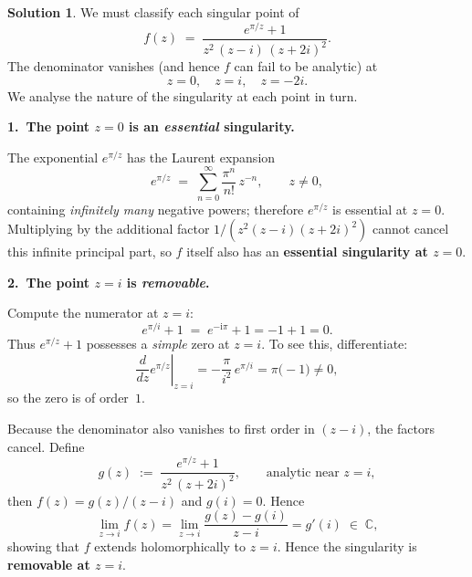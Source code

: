 \documentclass[12pt]{article}
\theoremstyle{definition} %
\newtheorem{solution}{Solution}
\theoremstyle{plain} %
\begin{document}
          \begin{solution}
            We must classify each singular point of 
            \[
               f(z)\;=\;\frac{e^{\pi/z}+1}{z^{2}\,(z-i)\,(z+2i)^{2}}.
            \]
            The denominator vanishes (and hence $f$ can fail to be analytic) at
            \[
               z=0,\quad z=i,\quad z=-2i.
            \]
            We analyse the nature of the singularity at each point in turn.
            
            \bigskip
            \textbf{1.\ The point $z=0$ is an \emph{essential} singularity.}
            
            The exponential $e^{\pi/z}$ has the Laurent expansion
            \[
               e^{\pi/z}
               \;=\;
               \sum_{n=0}^{\infty}\frac{\pi^{n}}{n!}\,z^{-n},
               \qquad z\neq0,
            \]
            containing \emph{infinitely many} negative powers; therefore
            $e^{\pi/z}$ is essential at $z=0$.
            Multiplying by the additional factor
            $1/(z^{2}(z-i)(z+2i)^{2})$ cannot cancel this infinite principal part,
            so $f$ itself also has an \textbf{essential singularity at $z=0$}.
            
            \bigskip
            \textbf{2.\ The point $z=i$ is \emph{removable}.}
            
            Compute the numerator at $z=i$:
            \[
               e^{\pi/i}+1
               \;=\;
               e^{-\mathrm{i}\pi}+1
               =
               -1+1
               =0.
            \]
            Thus $e^{\pi/z}+1$ possesses a \emph{simple} zero at $z=i$.
            To see this, differentiate:
            \[
               \left.\frac{d}{dz}e^{\pi/z}\right|_{z=i}
               = -\frac{\pi}{i^{2}}\,e^{\pi/i}
               = \pi\bigl(-1\bigr)
               \neq 0,
            \]
            so the zero is of order~$1$.
            
            Because the denominator also vanishes to first order in $(z-i)$,
            the factors cancel.  Define
            \[
               g(z)
               \;:=\;
               \frac{e^{\pi/z}+1}{z^{2}\,(z+2i)^{2}},
               \qquad\text{analytic near }z=i,
            \]
            then $f(z)=g(z)/(z-i)$ and $g(i)=0$.
            Hence
            \[
               \lim_{z\to i}f(z)
               =\lim_{z\to i}\frac{g(z)-g(i)}{z-i}
               =g'(i)
               \;\in\;\mathbb{C},
            \]
            showing that $f$ extends holomorphically to $z=i$.
            Hence the singularity is \textbf{removable at $z=i$}.
            

\end{solution}
\end{document}

